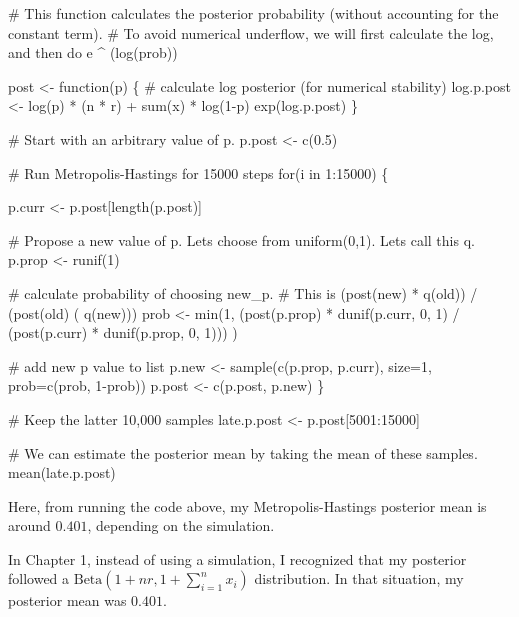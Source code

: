 \documentclass[
  letterpaper,
  DIV=11,
  numbers=noendperiod]{scrreprt}
\newenvironment{Shaded}{\begin{snugshade}}{\end{snugshade}}
\newcommand{\NormalTok}[1]{\textcolor[rgb]{0.00,0.23,0.31}{#1}}
\begin{document}
\begin{Shaded}
\begin{Highlighting}[]

\NormalTok{\# This function calculates the posterior probability (without accounting for the constant term).}
\NormalTok{\# To avoid numerical underflow, we will first calculate the log, and then do e \^{} (log(prob))}

\NormalTok{post \textless{}{-} function(p) \{}
\NormalTok{  \# calculate log posterior (for numerical stability)}
\NormalTok{  log.p.post \textless{}{-} log(p) * (n * r) +  sum(x) * log(1{-}p)}
\NormalTok{  exp(log.p.post)}
\NormalTok{\}}

\NormalTok{\# Start with an arbitrary value of p.}
\NormalTok{p.post \textless{}{-} c(0.5)}

\NormalTok{\# Run Metropolis{-}Hastings for 15000 steps}
\NormalTok{for(i in 1:15000) \{}

\NormalTok{  p.curr \textless{}{-} p.post[length(p.post)]}
  
\NormalTok{  \# Propose a new value of p. Let\textquotesingle{}s choose from uniform(0,1). Let\textquotesingle{}s call this q.}
\NormalTok{  p.prop \textless{}{-} runif(1)}
  
\NormalTok{  \# calculate probability of choosing new\_p.}
\NormalTok{  \# This is (post(new) * q(old)) / (post(old) ( q(new)))}
\NormalTok{  prob \textless{}{-} min(1,}
\NormalTok{    (post(p.prop) * dunif(p.curr, 0, 1) /}
\NormalTok{      (post(p.curr) * dunif(p.prop, 0, 1)))}
\NormalTok{  )}

\NormalTok{  \# add new p value to list}
\NormalTok{  p.new \textless{}{-} sample(c(p.prop, p.curr),}
\NormalTok{                      size=1, prob=c(prob, 1{-}prob))}
\NormalTok{  p.post \textless{}{-} c(p.post, p.new)}
\NormalTok{\}}

\NormalTok{\# Keep the latter 10,000 samples}
\NormalTok{late.p.post \textless{}{-} p.post[5001:15000]}

\NormalTok{\# We can estimate the posterior mean by taking the mean of these samples.}
\NormalTok{mean(late.p.post)}
\end{Highlighting}
\end{Shaded}

Here, from running the code above, my Metropolis-Hastings posterior mean
is around \(0.401\), depending on the simulation.

In Chapter 1, instead of using a simulation, I recognized that my
posterior followed a \(\text{Beta}(1 + nr, 1+ \sum_{i=1}^n x_i)\)
distribution. In that situation, my posterior mean was \(0.401\).
\end{document}
